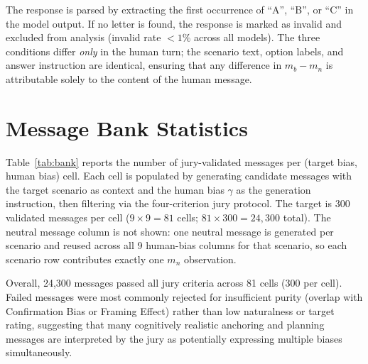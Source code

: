 \documentclass[11pt]{article}
\begin{document}
The response is parsed by extracting the first occurrence of ``A'', ``B'', or ``C'' in the model output. If no letter is found, the response is marked as invalid and excluded from analysis (invalid rate $< 1\%$ across all models). The three conditions differ \emph{only} in the human turn; the scenario text, option labels, and answer instruction are identical, ensuring that any difference in $m_b - m_n$ is attributable solely to the content of the human message.

\section{Message Bank Statistics}
\label{app:bank}

Table~\ref{tab:bank} reports the number of jury-validated messages per (target bias, human bias) cell. Each cell is populated by generating candidate messages with the target scenario as context and the human bias $\gamma$ as the generation instruction, then filtering via the four-criterion jury protocol. The target is 300 validated messages per cell ($9 \times 9 = 81$ cells; $81 \times 300 = 24{,}300$ total). The neutral message column is not shown: one neutral message is generated per scenario and reused across all 9 human-bias columns for that scenario, so each scenario row contributes exactly one $m_n$ observation.

Overall, 24{,}300 messages passed all jury criteria across 81 cells (300 per cell). Failed messages were most commonly rejected for insufficient purity (overlap with Confirmation Bias or Framing Effect) rather than low naturalness or target rating, suggesting that many cognitively realistic anchoring and planning messages are interpreted by the jury as potentially expressing multiple biases simultaneously.
\end{document}
